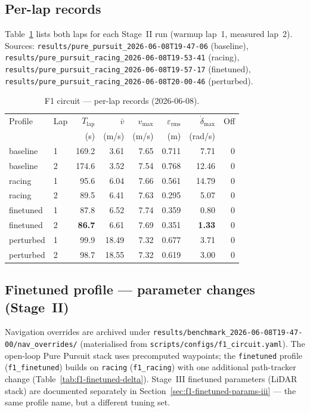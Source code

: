 \documentclass[11pt,a4paper]{article}
\newcommand{\runref}[1]{\texttt{results/#1}}
\newcommand{\best}[1]{\textbf{#1}}
\newcommand{\cfg}[1]{\texttt{\small #1}}
\begin{document}
\subsection{Per-lap records}

Table~\ref{tab:f1-laps} lists both laps for each Stage~II run
(warmup lap~1, measured lap~2).
Sources: \runref{pure\_pursuit\_2026-06-08T19-47-06} (baseline),
\runref{pure\_pursuit\_racing\_2026-06-08T19-53-41} (racing),
\runref{pure\_pursuit\_racing\_2026-06-08T19-57-17} (finetuned),
\runref{pure\_pursuit\_racing\_2026-06-08T20-00-46} (perturbed).

\begin{table}[H]
  \centering
  \caption{F1 circuit --- per-lap records (2026-06-08).}
  \label{tab:f1-laps}
  \footnotesize
  \setlength{\tabcolsep}{3pt}
  \begin{tabular}{@{}ll r r r r r r@{}}
    \toprule
    Profile & Lap & $T_{\mathrm{lap}}$ & $\bar{v}$ & $v_{\max}$ &
    $\varepsilon_{\mathrm{rms}}$ & $\dot{\delta}_{\max}$ & Off \\
    & & (s) & (m/s) & (m/s) & (m) & (rad/s) & \\
    \midrule
    baseline  & 1 & 169.2 & 3.61 & 7.65 & 0.711 &  7.71 & 0 \\
    baseline  & 2 & 174.6 & 3.52 & 7.54 & 0.768 & 12.46 & 0 \\
    \addlinespace
    racing    & 1 &  95.6 & 6.04 & 7.66 & 0.561 & 14.79 & 0 \\
    racing    & 2 &  89.5 & 6.41 & 7.63 & 0.295 &  5.07 & 0 \\
    \addlinespace
    finetuned & 1 &  87.8 & 6.52 & 7.74 & 0.359 &  0.80 & 0 \\
    finetuned & 2 &  \best{86.7} & 6.61 & 7.69 & 0.351 & \best{1.33} & 0 \\
    \addlinespace
    perturbed & 1 &  99.9 & 18.49 & 7.32 & 0.677 &  3.71 & 0 \\
    perturbed & 2 &  98.7 & 18.55 & 7.32 & 0.619 &  3.00 & 0 \\
    \bottomrule
  \end{tabular}
\end{table}

\subsection{Finetuned profile --- parameter changes (Stage~II)}
\label{sec:f1-finetuned-params-ii}

Navigation overrides are archived under
\runref{benchmark\_2026-06-08T19-47-00/nav\_overrides/}
(materialised from \texttt{scripts/configs/f1\_circuit.yaml}).
The open-loop Pure Pursuit stack uses precomputed waypoints; the
\cfg{finetuned} profile (\cfg{f1\_finetuned}) builds on \cfg{racing}
(\cfg{f1\_racing}) with one additional path-tracker change
(Table~\ref{tab:f1-finetuned-delta}).
Stage~III finetuned parameters (LiDAR stack) are documented separately in
Section~\ref{sec:f1-finetuned-params-iii} --- the same profile name, but a
different tuning set.
\end{document}
